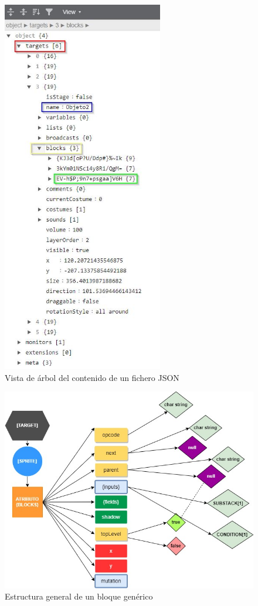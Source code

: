 \documentclass[a4paper, 12pt]{book}
\begin{document}
\begin{figure}[!htb]
  \centering
  \includegraphics[width=7cm, keepaspectratio]{img/jsontree.jpg}
  \caption{Vista de árbol del contenido de un fichero JSON}
  \label{fig:arboljson}
\end{figure}

\begin{figure}[!htb]
  \centering
  \includegraphics[width=13cm, keepaspectratio]{img/block_general.jpg}
  \caption{Estructura general de un bloque genérico}
  \label{fig:graljson}
\end{figure}
\end{document}
